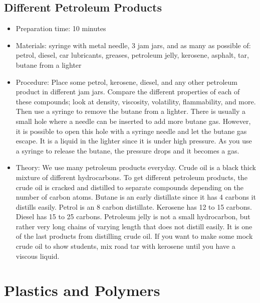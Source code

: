 \subsection{Different Petroleum Products}
\begin{itemize}
\item{Preparation time: 10 minutes}
\item{Materials: syringe with metal needle, 3 jam jars, and as many as possible of: petrol, diesel, car lubricants, greases, petroleum jelly, kerosene, asphalt, tar, butane from a lighter}
\item{Procedure: Place some petrol, kerosene, diesel, and any other petroleum product in different jam jars. Compare the different properties of each of these compounds; look at density, viscosity, volatility, flammability, and more. Then use a syringe to remove the butane from a lighter. There is usually a small hole where a needle can be inserted to add more butane gas. However, it is possible to open this hole with a syringe needle and let the butane gas escape. It is a liquid in the lighter since it is under high pressure. As you use a syringe to release the butane, the pressure drops and it becomes a gas.}
\item{Theory: We use many petroleum products everyday. Crude oil is a black thick mixture of different hydrocarbons. To get different petroleum products, the crude oil is cracked and distilled to separate compounds depending on the number of carbon atoms. Butane is an early distillate since it has 4 carbons it distills easily. Petrol is an 8 carbon distillate. Kerosene has 12 to 15 carbons. Diesel has 15 to 25 carbons. Petroleum jelly is not a small hydrocarbon, but rather very long chains of varying length that does not distill easily. It is one of the last products from distilling crude oil. If you want to make some mock crude oil to show students, mix road tar with kerosene until you have a viscous liquid.}
\end{itemize}

\section{Plastics and Polymers}

